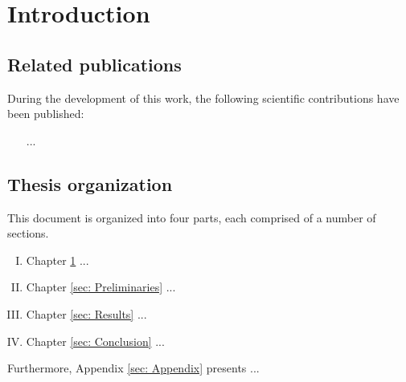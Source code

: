 \chapter{Introduction} \label{sec: Introduction}

\lipsum[1-2][4-8]

\section{Related publications} \label{sec: Introduction_Related_Publications}

During the development of this work, the following scientific contributions have been published:

\begin{itemize}
    \item [...]
\end{itemize}

\section{Thesis organization} \label{sec: Introduction_Thesis_Organization}

This document is organized into four parts, each comprised of a number of sections. 
\begin{enumerate}[I.]
    \item Chapter \ref{sec: Introduction} ... 
    \item Chapter \ref{sec: Preliminaries} ... 
    \item Chapter \ref{sec: Results} ... 
    \item Chapter \ref{sec: Conclusion} ... 
\end{enumerate}

Furthermore, Appendix \ref{sec: Appendix} presents ... 
